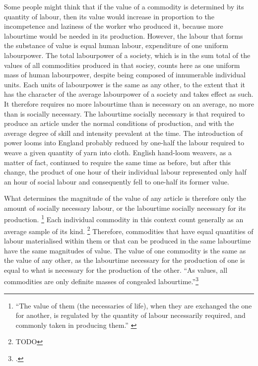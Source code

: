 Some people might think that if the value of a commodity
is determined by its quantity of labour,
then its value would increase
in proportion to the incompetence and laziness of the worker who produced it,
because more labourtime would be needed in its production.
However,
the labour that forms the substance of value
is equal human labour,
expenditure of one uniform labourpower.
The total labourpower of a society,
which is in the sum total of the values 
of all commodities produced in that sociey,
counts here as one uniform mass of human labourpower,
despite being composed of innumerable individual units.
Each units of labourpower
is the same as any other,
to the extent that it has the character of the average labourpower of a society 
and takes effect as such. It therefore requires no more labourtime
than is necessary on an average,
no more than is socially necessary.
The labourtime socially necessary 
is that required to produce an article 
under the normal conditions of production,
and with the average degree of skill and intensity 
prevalent at the time.
The introduction of power looms into England
probably reduced by one-half 
the labour required to weave a given quantity of yarn into cloth.
English hand-loom weavers, as a matter of fact,
continued to require the same time as before,
but after this change,
the product of one hour of their individual labour 
represented only half an hour of social labour
and consequently fell to one-half its former value.

What determines the magnitude of the value of any article 
is therefore only the amount of socially necessary labour,
or the labourtime socially necessary for its production.%
\footnote{
    \enquote{The value of them (the necessaries of life),
    when they are exchanged the one for another,
    is regulated by the quantity of labour
    necessarily required, and commonly taken in producing them.} 
    \citep[36]{fn09}
}
Each individual commodity in this context
count generally as an average sample of its kind.
\footnote{TODO} 
Therefore, commodities that have equal quantities of labour materialised within them
or that can be produced in the same labourtime
have the same magnitudes of value.
The value of one commodity 
is the same as the value of any other,
as the labourtime necessary for the production of one 
is equal to what is necessary for the production of the other.%
\enquote{As values, all commodities are only definite masses
of congealed labourtime.}\footcite{TODO}

